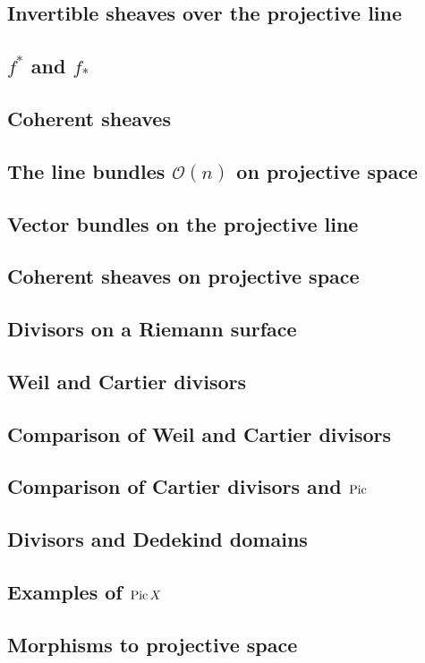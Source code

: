 \documentclass [11 pt, oneside, margin = 1 in] {article}
\begin{document}
\subsection{Invertible sheaves over the projective line}
\subsection{$f^*$ and $f_*$}
\subsection{Coherent sheaves}
\subsection{The line bundles $\mathscr O(n)$ on projective space}
\subsection{Vector bundles on the projective line}
\subsection{Coherent sheaves on projective space}
\subsection{Divisors on a Riemann surface}
\subsection{Weil and Cartier divisors}
\subsection{Comparison of Weil and Cartier divisors}
\subsection{Comparison of Cartier divisors and $\operatorname{Pic}$}
\subsection{Divisors and Dedekind domains}
\subsection{Examples of $\operatorname{Pic} X$}
\subsection{Morphisms to projective space}
\end{document}
